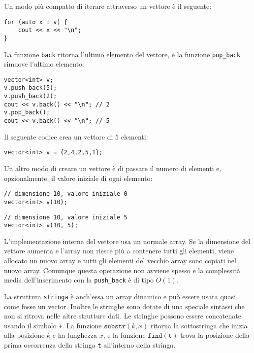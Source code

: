 \begin{samepage}
Un modo più compatto di iterare attraverso un vettore è il seguente:

\begin{lstlisting}
for (auto x : v) {
    cout << x << "\n";
}
\end{lstlisting}
\end{samepage}

La funzione \texttt{back} ritorna l'ultimo elemento del vettore, e la 
funzione \texttt{pop\_back} rimuove l'ultimo elemento:

\begin{lstlisting}
vector<int> v;
v.push_back(5);
v.push_back(2);
cout << v.back() << "\n"; // 2
v.pop_back();
cout << v.back() << "\n"; // 5
\end{lstlisting}

Il seguente codice crea un vettore di 5 elementi:

\begin{lstlisting}
vector<int> v = {2,4,2,5,1};
\end{lstlisting}

Un altro modo di creare un vettore è di passare il numero 
di elementi e, opzionalmente, il valore iniziale di ogni elemento:

\begin{lstlisting}
// dimensione 10, valore iniziale 0
vector<int> v(10);
\end{lstlisting}
\begin{lstlisting}
// dimensione 10, valore iniziale 5
vector<int> v(10, 5);
\end{lstlisting}

L'implementazione interna del vettore 
usa un normale array. 
Se la dimensione del vettore aumenta
e l'array non riesce più a contenere tutti gli elementi,
viene allocato un nuovo array e tutti gli elementi
del vecchio array sono copiati nel nuovo array.
Comunque questa operazione non avviene spesso e la 
complessità media dell'inserimento con la \texttt{push\_back} è di tipo
$O(1)$.


La struttura \texttt{stringa} è anch'essa un array dinamico
e può essere usata quasi come fosse un vector.
Inoltre le stringhe sono dotate di una speciale sintassi
che non si ritrova nelle altre strutture dati.
Le stringhe possono essere concatenate usando il simbolo \texttt{+}.
La funzione $\texttt{substr}(k,x)$ ritorna la sottostringa
che inizia alla posizione $k$ e ha lunghezza $x$,
e la funzione $\texttt{find}(\texttt{t})$ trova la posizione della prima
occorrenza della stringa \texttt{t} all'interno della stringa.

